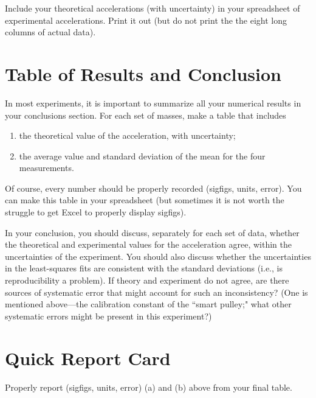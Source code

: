 Include your theoretical accelerations (with uncertainty) in your
spreadsheet of experimental accelerations.  Print it out (but do not print
the the eight long columns of actual data).

\section*{Table of Results and Conclusion}

In most experiments, it is important to summarize all your
numerical results in your conclusions section.  For each set of
masses, make a table that includes
\begin{enumerate}
\renewcommand{\labelenumi}{(\alph{enumi})}
\item  the theoretical value of the acceleration, with uncertainty;
%
%
\item the average value and standard deviation of the mean for the
four measurements.
\end{enumerate}
Of course, every number should be properly recorded (sigfigs, units, error).
You can make this table in your spreadsheet (but sometimes it is not worth
the struggle to get Excel to properly display sigfigs).

In your conclusion, you should discuss, separately for each set of
data, whether the theoretical and experimental values for the
acceleration agree, within the uncertainties of the experiment.  You
should also discuss whether the uncertainties in the least-squares
fits are consistent with the standard deviations (i.e., is reproducibility
a problem).
If theory and experiment do not agree, are there sources of systematic error that
might account for such an inconsistency?  (One is mentioned
above---the
calibration constant of the ``smart pulley;" what other systematic
errors might be present in this experiment?)

\section*{Quick Report Card}
Properly report (sigfigs, units, error) (a) and (b) above from your final table.


